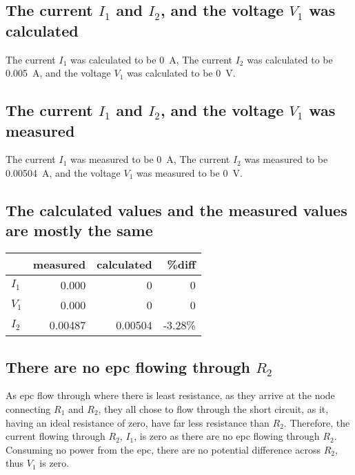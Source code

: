 \documentclass{article}
\begin{document}
\subsection{The current $I_1$ and $I_2$, and the voltage $V_1$ was calculated}
The current $I_1$ was calculated to be \SI{0}{\ampere}, The current $I_2$ was calculated to be \SI{0.005}{\ampere}, and the voltage $V_1$ was calculated to be \SI{0}{\volt}.

\subsection{The current $I_1$ and $I_2$, and the voltage $V_1$ was measured}
The current $I_1$ was measured to be \SI{0}{\ampere}, The current $I_2$ was measured to be \SI{0.00504}{\ampere}, and the voltage $V_1$ was measured to be \SI{0}{\volt}.

\subsection{The calculated values and the measured values are mostly the same}
\begin{table}[H]
\centering
    \begin{tabular}{@{} l r r r@{}}
         \toprule
         &measured & calculated & \%diff  \\
         \midrule
            $I_1$ & 0.000 & 0 & 0 \\
            $V_1$ & 0.000 & 0 & 0 \\
            $I_2$ & 0.00487 & 0.00504 & -3.28\% \\ 
         \bottomrule
    \end{tabular}
\end{table}

\subsection{There are no epc flowing through $R_2$}
As epc flow through where there is least resistance, as they arrive at the node connecting $R_1$ and $R_2$, they all chose to flow through the short circuit, as it, having an ideal resistance of zero, have far less resistance than $R_2$. Therefore, the current flowing through $R_2$, $I_1$, is zero as there are no epc flowing through $R_2$. Consuming no power from the epc, there are no potential difference across $R_2$, thus $V_1$ is zero.
\end{document}
